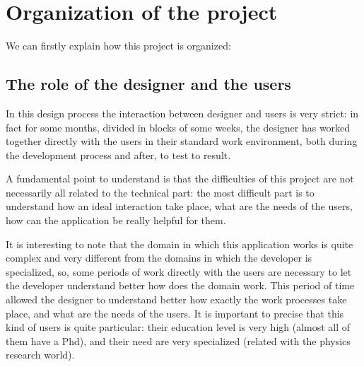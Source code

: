 
\chapter{Organization of the project} %

\label{Chapter2} %


We can firstly explain how this project is organized:

\section{The role of the designer and the users}
In this design process the interaction between designer and users is very strict: in fact for some months, divided in blocks of some weeks, the designer has worked together directly with the users in their standard work environment, both during the development process and after, to test to result. 

A fundamental point to understand is that the difficulties of this project are not necessarily all related to the technical part: the most difficult part is to understand how an ideal interaction take place, what are the needs of the users, how can the application be really helpful for them.
 
It is interesting to note that the domain in which this application works is quite complex and very different from the domains in which the developer is specialized, so, some periods of work directly with the users are necessary to let the developer understand better how does the domain work.
This period of time allowed the designer to understand better how exactly the work processes take place, and what are the needs of the users. 
It is important to precise that this kind of users is quite particular: their education level is very high (almost all of them have a Phd), and their need are very specialized (related with the physics research world).

